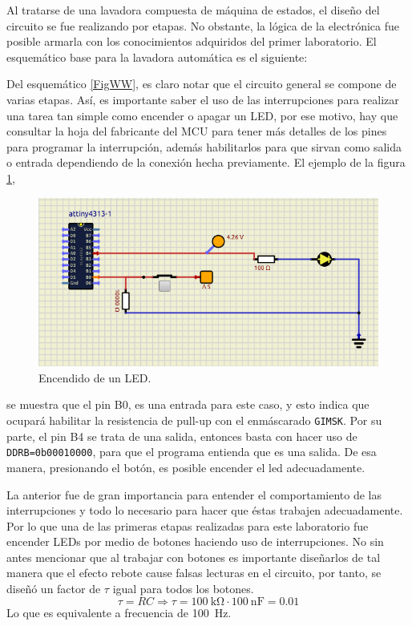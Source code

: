 Al tratarse de una lavadora compuesta de máquina de estados, el diseño del circuito se fue realizando por etapas. No obstante, la lógica de la electrónica fue posible armarla con los conocimientos adquiridos del primer laboratorio. El esquemático base para la lavadora automática es el siguiente:
 
Del esquemático \ref{FigWW}, es claro notar que el circuito general se compone de varias etapas. Así, es importante saber el uso de las interrupciones para realizar una tarea tan simple como encender o apagar un LED, por ese motivo, hay que consultar la hoja del fabricante del MCU para tener más detalles de los pines para programar la interrupción, además habilitarlos para que sirvan como salida o entrada dependiendo de la conexión hecha previamente. El ejemplo de la figura \ref{fig11},
    \begin{figure}[H]
        \centering
        \includegraphics[width=.7\linewidth]{Imagenes/5.1.png}
        \caption{Encendido de un LED.}
        \label{fig11}
    \end{figure}
se muestra que el pin B0, es una entrada para este caso, y esto indica que ocupará habilitar la resistencia de pull-up con el enmáscarado \texttt{GIMSK}. Por su parte, el pin B4 se trata de una salida, entonces basta con hacer uso de \texttt{DDRB=0b00010000}, para que el programa entienda que es una salida. De esa manera, presionando el botón, es posible encender el led adecuadamente.\par
La anterior fue de gran importancia para entender el comportamiento de las interrupciones y todo lo necesario para hacer que éstas trabajen adecuadamente. Por lo que una de las primeras etapas realizadas para este laboratorio fue encender LEDs por medio de botones haciendo uso de interrupciones. No sin antes mencionar que al trabajar con botones es importante diseñarlos de tal manera que el efecto rebote cause falsas lecturas en el circuito, por tanto, se diseñó un factor de $\tau$ igual para todos los botones.
\begin{equation}
\tau = RC \Rightarrow \tau = \SI{100}{\kilo\ohm} \cdot \SI{100}{\nano\farad} = 0.01
\end{equation}
Lo que es equivalente a frecuencia de \SI{100}{\Hz}.

